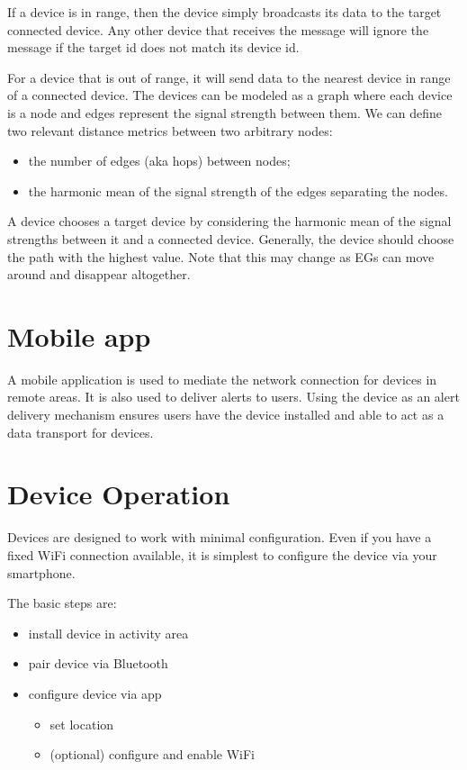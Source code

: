 \documentclass[
]{book}
\providecommand{\tightlist}{%
  \setlength{\itemsep}{0pt}\setlength{\parskip}{0pt}}
\begin{document}
If a device is in range, then the device simply broadcasts its data to
the target connected device.
Any other device that receives the message will ignore the message
if the target id does not match its device id.

For a device that is out of range, it will send data to the nearest device
in range of a connected device.
The devices can be modeled as a graph where each device is a node
and edges represent the signal strength between them.
We can define two relevant distance metrics between two arbitrary nodes:

\begin{itemize}
\tightlist
\item
  the number of edges (aka hops) between nodes;
\item
  the harmonic mean of the signal strength of the edges separating the nodes.
\end{itemize}

A device chooses a target device by considering the harmonic mean of
the signal strengths between it and a connected device.
Generally, the device should choose the path with the highest value.
Note that this may change as EGs can move around and disappear altogether.

\hypertarget{mobile-app}{%
\chapter{Mobile app}\label{mobile-app}}

A mobile application is used to mediate the network connection for devices
in remote areas. It is also used to deliver alerts to users.
Using the device as an alert delivery mechanism ensures users have the device
installed and able to act as a data transport for devices.

\hypertarget{device-operation}{%
\chapter{Device Operation}\label{device-operation}}

Devices are designed to work with minimal configuration.
Even if you have a fixed WiFi connection available,
it is simplest to configure the device via your smartphone.

The basic steps are:

\begin{itemize}
\tightlist
\item
  install device in activity area
\item
  pair device via Bluetooth
\item
  configure device via app

  \begin{itemize}
  \tightlist
  \item
    set location
  \item
    (optional) configure and enable WiFi
  \end{itemize}
\end{itemize}
\end{document}
